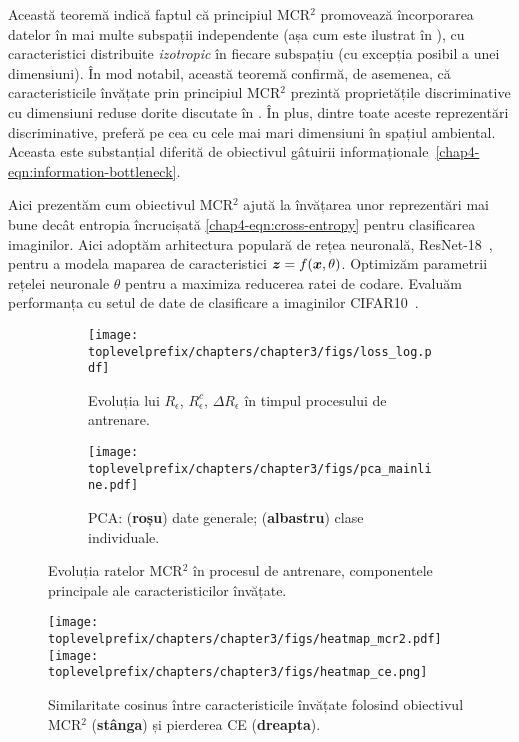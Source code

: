 \documentclass[../../book-main_ro.tex]{subfiles}
\begin{document}
Această teoremă indică faptul că principiul MCR$^2$ promovează încorporarea datelor în mai multe subspații independente (așa cum este ilustrat în ), cu caracteristici distribuite {\em izotropic} în fiecare subspațiu (cu excepția posibil a unei dimensiuni). În mod notabil, această teoremă confirmă, de asemenea, că caracteristicile învățate prin principiul MCR$^2$ prezintă proprietățile discriminative cu dimensiuni reduse dorite discutate în . În plus, dintre toate aceste reprezentări discriminative, preferă pe cea cu cele mai mari dimensiuni în spațiul ambiental. Aceasta este substanțial diferită de obiectivul gâtuirii informaționale~\eqref{chap4-eqn:information-bottleneck}.

\begin{example}
	Aici prezentăm cum obiectivul MCR$^2$ ajută la învățarea unor reprezentări mai bune decât entropia încrucișată \eqref{chap4-eqn:cross-entropy} pentru clasificarea imaginilor. Aici adoptăm arhitectura populară de rețea neuronală, ResNet-18~\cite{he2016deep}, pentru a modela maparea de caracteristici $\bm{z} = f(\bm{x},\theta)$. Optimizăm parametrii rețelei neuronale $\theta$ pentru a maximiza reducerea ratei de codare. Evaluăm performanța cu setul de date de clasificare a imaginilor CIFAR10~\cite{krizhevsky2009learning}.

	\begin{figure}[t]
		\begin{subfigure}[t]{0.42\textwidth}
			\centering
			\texttt{[image: \\toplevelprefix/chapters/chapter3/figs/loss\_log.pdf]}
			\caption{Evoluția lui $R_\epsilon$, $R^c_\epsilon$, $\Delta R_\epsilon$ în timpul procesului de antrenare.}
			\label{fig:train-test-loss-pca-1}
		\end{subfigure}
		\hfill
		\begin{subfigure}[t]{0.42\textwidth}
			\centering
			\texttt{[image: \\toplevelprefix/chapters/chapter3/figs/pca\_mainline.pdf]}
			\caption{PCA: {\small (\textbf{roșu}) date generale; (\textbf{albastru}) clase individuale}.}
			\label{fig:train-test-loss-pca-3}
		\end{subfigure}
		\caption{\small Evoluția ratelor MCR$^2$ în procesul de antrenare, componentele principale ale caracteristicilor învățate.}
		\label{fig:train-test-loss-pca}
	\end{figure}

	\begin{figure*}[b]
		\begin{center}
			\texttt{[image: \\toplevelprefix/chapters/chapter3/figs/heatmap\_mcr2.pdf]}
			\hspace{0.25cm}
			\texttt{[image: \\toplevelprefix/chapters/chapter3/figs/heatmap\_ce.png]}
			\caption{\small Similaritate cosinus între caracteristicile învățate folosind obiectivul MCR$^2$ (\textbf{stânga}) și pierderea CE (\textbf{dreapta}).}
			\label{fig:heatmap-plot}
		\end{center}
		\vskip -0.1in
	\end{figure*}


\end{example}
\end{document}
